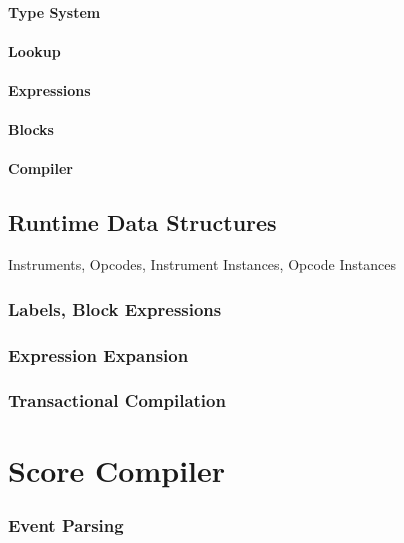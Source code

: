\documentclass[]{book}
\begin{document}
\subsubsection{Type System}

\subsubsection{Lookup}

\subsubsection{Expressions}

\subsubsection{Blocks}

\subsubsection{Compiler}

\section{Runtime Data Structures}

Instruments, Opcodes, Instrument Instances, Opcode Instances

\subsection{Labels, Block Expressions}

\subsection{Expression Expansion}

\subsection{Transactional Compilation}


\chapter{Score Compiler}

\subsection{Event Parsing}
\end{document}
